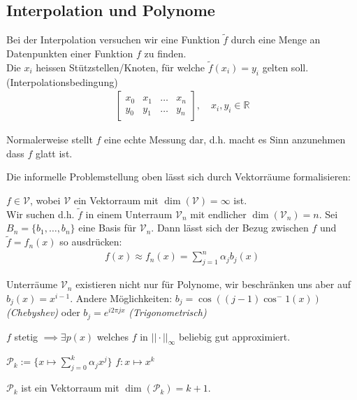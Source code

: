 \subsection{Interpolation und Polynome}
Bei der Interpolation versuchen wir eine Funktion $\tilde{f}$ durch eine Menge an Datenpunkten einer Funktion $f$ zu finden.\\
Die $x_i$ heissen Stützstellen/Knoten, für welche $\tilde{f}(x_i) = y_i$ gelten soll. (Interpolationsbedingung)
\begin{align*}
	\begin{bmatrix}
		x_0 & x_1 & \ldots & x_n \\
		y_0 & y_1 & \ldots & y_n
	\end{bmatrix},
	\quad x_i, y_i \in \mathbb{R}
\end{align*}

Normalerweise stellt $f$ eine echte Messung dar, d.h. macht es Sinn anzunehmen dass $f$ glatt ist.

Die informelle Problemstellung oben lässt sich durch Vektorräume formalisieren:

$f \in \mathcal{V}$, wobei $\mathcal{V}$ ein Vektorraum mit $\dim(\mathcal{V}) = \infty$ ist. \\
Wir suchen d.h. $\tilde{f}$ in einem Unterraum $\mathcal{V}_n$ mit endlicher $\dim(\mathcal{V}_n) = n$.
Sei $B_n = \{b_1,\ldots,b_n\}$ eine Basis für $\mathcal{V}_n$.
Dann lässt sich der Bezug zwischen $f$ und $\tilde{f} = f_n(x)$ so ausdrücken:
\begin{align*}
	f(x) \approx f_n(x) = \sum_{j=1}^n \alpha_j b_j(x)
\end{align*}

\inlineremark Unterräume $\mathcal{V}_n$ existieren nicht nur für Polynome, wir beschränken uns aber auf $b_j(x) = x^{i-1}$.
Andere Möglichkeiten: $b_j = \cos((j-1)\cos^-1(x))$ \textit{(Chebyshev)} oder $b_j = e^{i2\pi j x}$ \textit{(Trigonometrisch)}


 $f$ stetig $\implies \exists p(x)$ welches $f$ in $||\cdot||_\infty$ beliebig gut approximiert.

 $\mathcal{P}_k := \{ x \mapsto \sum_{j = 0}^{k} \alpha_j x^j \}$
 $f: x \mapsto x^k$

 $\mathcal{P}_k$ ist ein Vektorraum mit $\dim(\mathcal{P}_k) = k+1$.
